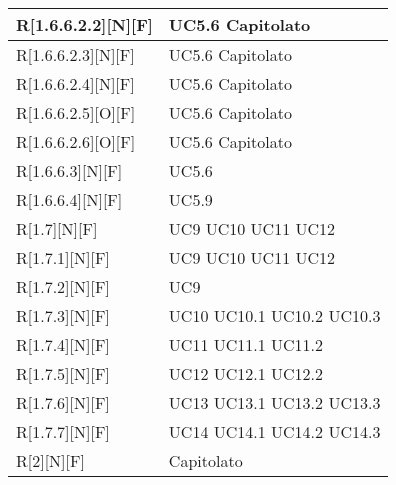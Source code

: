 \begin{longtable}{X | X}
\hline
R[1.6.6.2.2][N][F] & UC5.6 \newline Capitolato \\
\hline
R[1.6.6.2.3][N][F] & UC5.6 \newline Capitolato \\
\hline
R[1.6.6.2.4][N][F] & UC5.6 \newline Capitolato \\
\hline
R[1.6.6.2.5][O][F] & UC5.6 \newline Capitolato \\
\hline
R[1.6.6.2.6][O][F] & UC5.6 \newline Capitolato \\
\hline
R[1.6.6.3][N][F] & UC5.6 \\
\hline
R[1.6.6.4][N][F] & UC5.9 \\
\hline
R[1.7][N][F] & UC9 \newline UC10 \newline UC11 \newline UC12 \newline \\
\hline
R[1.7.1][N][F] & UC9 \newline UC10 \newline UC11 \newline UC12 \newline \\
\hline
R[1.7.2][N][F] & UC9 \\
\hline
R[1.7.3][N][F] & UC10 \newline UC10.1 \newline UC10.2 \newline UC10.3 \\
\hline
R[1.7.4][N][F] & UC11 \newline UC11.1 \newline UC11.2 \\
\hline
R[1.7.5][N][F] & UC12 \newline UC12.1 \newline UC12.2 \\
\hline
R[1.7.6][N][F] & UC13 \newline UC13.1 \newline UC13.2 \newline UC13.3 \\
\hline
R[1.7.7][N][F] & UC14 \newline UC14.1 \newline UC14.2 \newline UC14.3 \\
\hline
R[2][N][F] & Capitolato \\

\end{longtable}
